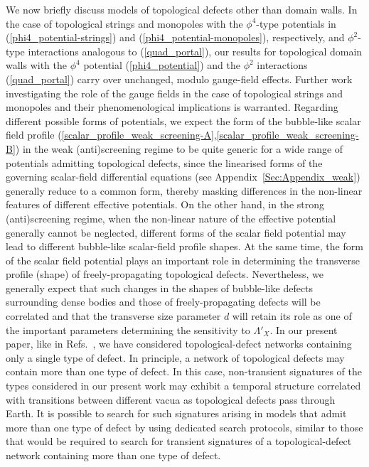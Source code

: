 \documentclass[aps,prd,onecolumn,nofootinbib]{revtex4-2} %
\begin{document}
We now briefly discuss models of topological defects other than domain walls. 
In the case of topological strings and monopoles with the $\phi^4$-type potentials in (\ref{phi4_potential-strings}) and (\ref{phi4_potential-monopoles}), respectively, and $\phi^2$-type interactions analogous to (\ref{quad_portal}), our results for topological domain walls with the $\phi^4$ potential (\ref{phi4_potential}) and the $\phi^2$ interactions (\ref{quad_portal}) carry over unchanged, modulo gauge-field effects. 
Further work investigating the role of the gauge fields in the case of topological strings and monopoles and their phenomenological implications is warranted. 
Regarding different possible forms of potentials, we expect the form of the bubble-like scalar field profile (\ref{scalar_profile_weak_screening-A},\ref{scalar_profile_weak_screening-B}) in the weak (anti)screening regime to be quite generic for a wide range of potentials admitting topological defects, since the linearised forms of the governing scalar-field differential equations (see Appendix~\ref{Sec:Appendix_weak}) generally reduce to a common form, thereby masking differences in the non-linear features of different effective potentials. 
On the other hand, in the strong (anti)screening regime, when the non-linear nature of the effective potential generally cannot be neglected, different forms of the scalar field potential may lead to different bubble-like scalar-field profile shapes. 
At the same time, the form of the scalar field potential plays an important role in determining the transverse profile (shape) of freely-propagating topological defects. 
Nevertheless, we generally expect that such changes in the shapes of bubble-like defects surrounding dense bodies and those of freely-propagating defects will be correlated and that the transverse size parameter $d$ will retain its role as one of the important parameters determining the sensitivity to $\Lambda'_X$. 
In our present paper, like in Refs.~\cite{Wcislo_2016_TDM-cavity,Roberts_2017_TDM-GPS,Wcislo_2018_TDM-cavity,Roberts_2019_TDM-clocks}, we have considered topological-defect networks containing only a single type of defect. 
In principle, a network of topological defects may contain more than one type of defect. 
In this case, non-transient signatures of the types considered in our present work may exhibit a temporal structure correlated with transitions between different vacua as topological defects pass through Earth. 
It is possible to search for such signatures arising in models that admit more than one type of defect by using dedicated search protocols, similar to those that would be required to search for transient signatures of a topological-defect network containing more than one type of defect. 
\end{document}
